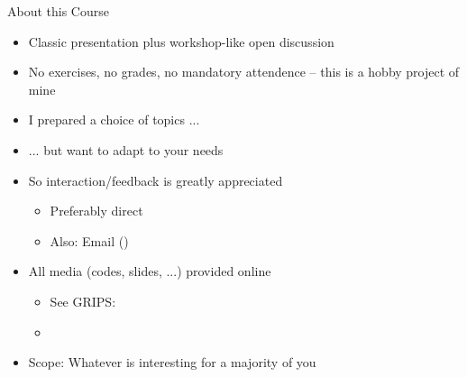 
\begin{frame}{About this Course}
%
\begin{itemize}
\item Classic presentation plus workshop-like open discussion
\item No exercises, no grades, no mandatory attendence -- this is a hobby project of mine
\item I prepared a choice of topics ...
\item ... but want to adapt to your needs
\item So interaction/feedback is greatly appreciated
	\begin{itemize}
	\item Preferably direct
	\item Also: Email ()
	\end{itemize}
\item All media (codes, slides, ...) provided online
	\begin{itemize}
	\item See GRIPS: 
	\item {}
	\end{itemize}
\item Scope: Whatever is interesting for a majority of you
\end{itemize}
%
\end{frame}


